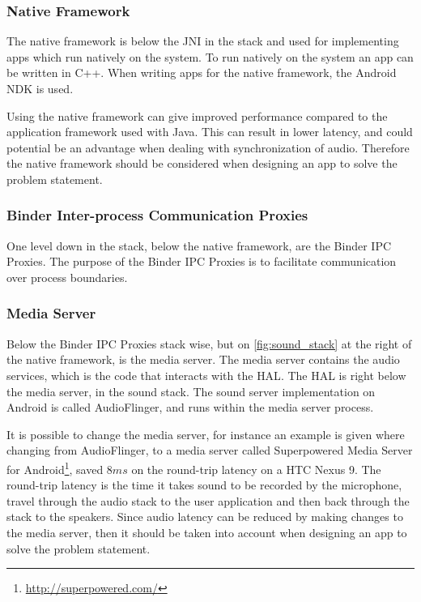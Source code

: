 \subsubsection*{Native Framework}
The native framework is below the \ac{JNI} in the stack and used for implementing apps which run natively on the system.
To run natively on the system an app can be written in C++.
When writing apps for the native framework, the Android \ac{NDK} is used.

Using the native framework can give improved performance compared to the application framework used with Java\cite{nat_perf_2}.
This can result in lower latency, and could potential be an advantage when dealing with synchronization of audio.
Therefore the native framework should be considered when designing an app to solve the problem statement.

\subsubsection*{Binder Inter-process Communication Proxies}
One level down in the stack, below the native framework, are the Binder \ac{IPC} Proxies.
The purpose of the Binder \ac{IPC} Proxies is to facilitate communication over process boundaries.

\subsubsection*{Media Server}
Below the Binder \ac{IPC} Proxies stack wise, but on \cref{fig:sound_stack} at the right of the native framework, is the media server.
The media server contains the audio services, which is the code that interacts with the \ac{HAL}.
The \ac{HAL} is right below the media server, in the sound stack.
The sound server implementation on Android is called AudioFlinger, and runs within the media server process\cite{audioflinger}.

It is possible to change the media server,
for instance an example is given where changing from AudioFlinger, to a media server called Superpowered Media Server for Android\footnote{\url{http://superpowered.com/}}, saved $8 ms$ on the round-trip latency on a HTC Nexus 9\cite{superpowered_8ms}.
The round-trip latency is the time it takes sound to be recorded by the microphone,
travel through the audio stack to the user application and then back through the stack to the speakers\cite{superpowered_8ms}.
Since audio latency can be reduced by making changes to the media server,
then it should be taken into account when designing an app to solve the problem statement.

